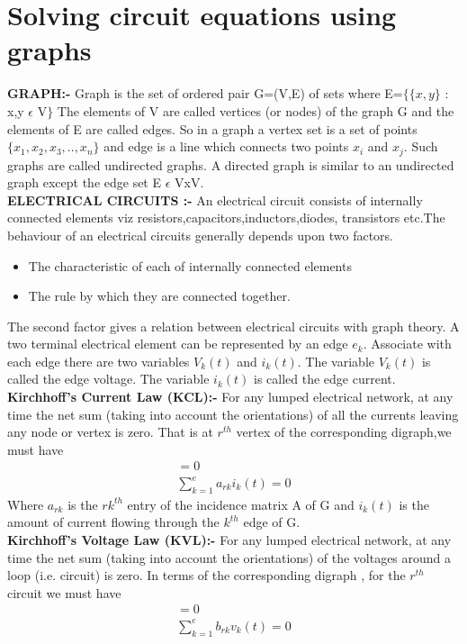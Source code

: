 \documentclass[journal,12pt,twocolumn]{IEEEtran}
\begin{document}
\section{Solving circuit equations using graphs}
\textbf{GRAPH:- } Graph is the set of ordered pair G=(V,E) of sets where  E=$\{\{x,y\}$ : x,y $\epsilon$ V$\}$
The elements of V are called vertices (or nodes) of the graph G and the elements of E are called edges. So in a graph a vertex set is a set of 
points $\{x_1,x_2,x_3,..,x_n\}$ and edge is a line which connects two points $x_i$ and $x_j$. Such graphs are called undirected graphs. A directed graph is similar to an undirected graph except the edge set E $\epsilon$ VxV.
\\
\textbf{ELECTRICAL CIRCUITS :-} An electrical circuit consists of internally connected elements viz resistors,capacitors,inductors,diodes, transistors etc.The behaviour of an electrical circuits generally depends upon two factors.
\begin{itemize}
    \item The characteristic of each of internally connected elements
    \item The rule by which they are connected together.
\end{itemize}
The second factor gives a relation between electrical circuits with graph theory. A two terminal electrical element can be represented by an edge $e_k$. Associate with each edge there are two variables $V_k(t)$ and $i_k(t)$. The variable $V_k(t)$ is called the edge voltage. The variable $i_k(t)$ is called the edge current.
\\
\textbf{Kirchhoff’s Current Law (KCL):-} For any lumped electrical network, at any time the net sum (taking into account the orientations) of all the currents leaving any node or vertex is zero. That is at $r^{th}$ vertex of the corresponding digraph,we must have
\begin{align}
    [A][I] = 0\\
    \sum_{k=1}^{e} a_{rk}i_k(t) = 0
\end{align}
Where $a_{rk}$ is the $rk^{th}$ entry of the incidence matrix A of G and 
$i_k(t)$ is the amount of current flowing through the $k^{th}$
edge of G.
\\
\textbf{Kirchhoff’s Voltage Law (KVL):-} For any lumped electrical network, at any time the net sum (taking into account the orientations) of the voltages around a loop (i.e. circuit) is zero. In terms of the corresponding digraph , for the $r^{th}$ circuit 
we must have
\begin{align}
    [B][V] = 0\\
    \sum_{k=1}^{e} b_{rk}v_k(t) = 0
\end{align}
\end{document}
